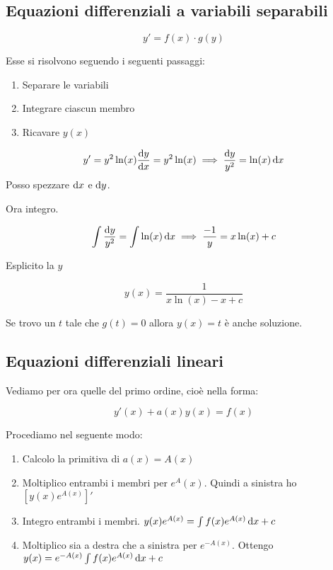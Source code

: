 \subsection{Equazioni differenziali a variabili separabili}

$$y' = f(x) \cdot g(y)$$

Esse si risolvono seguendo i seguenti passaggi:

\begin{enumerate}
\item Separare le variabili
\item Integrare ciascun membro
\item Ricavare $y(x)$
\end{enumerate}

\begin{example}
$$
y' = y^2 \ln(x) \\
\frac{\mathop{}\!\mathrm{d} y}{\mathop{}\!\mathrm{d} x} = y^2 \ln(x)  \implies
\frac{\mathop{}\!\mathrm{d} y}{y^2} = \ln(x) \mathop{}\!\mathrm{d} x
$$
Posso spezzare $\mathop{}\!\mathrm{d} x$ e $\mathop{}\!\mathrm{d} y$.

Ora integro.

$$
\int \frac{\mathop{}\!\mathrm{d} y}{y^2} = \int \ln(x) \mathop{}\!\mathrm{d} x \implies
\frac{-1}{y} = x \ln(x) + c
$$

Esplicito la $y$

$$y(x)  = \frac{1}{x\ln(x)-x+c}$$
\end{example}

Se trovo un $t$ tale che $g(t) = 0$ allora $y(x) = t$ è anche soluzione.

\subsection{Equazioni differenziali lineari}

Vediamo per ora quelle del primo ordine, cioè nella forma:

$$y'(x) + a(x)y(x) = f(x)$$

Procediamo nel seguente modo:

\begin{enumerate}
\item Calcolo la primitiva di $a(x) = A(x)$
\item Moltiplico entrambi i membri per $e^A(x)$. Quindi a sinistra ho $[y(x)e^{A(x)}]'$
\item Integro entrambi i membri. $y(x)e^{A(x)} = \int f(x)e^{A(x)} \mathop{}\!\mathrm{d} x +c$
\item Moltiplico sia a destra che a sinistra per $e^{-A(x)}$. Ottengo $y(x) = e^{-A(x)} \int f(x)e^{A(x)} \mathop{}\!\mathrm{d} x +c$
\end{enumerate}

